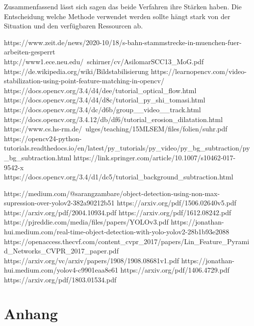 \documentclass[conference]{IEEEtran}
\begin{document}
	Zusammenfassend lässt sich sagen das beide Verfahren ihre Stärken haben. Die Entscheidung welche Methode verwendet werden sollte hängt stark von der Situation und den verfügbaren Ressourcen ab.
	
	\begin{thebibliography}{00}
		https://www.zeit.de/news/2020-10/18/s-bahn-stammstrecke-in-muenchen-fuer-arbeiten-gesperrt
		http://www1.ece.neu.edu/~schirner/cv/AsilomarSCC13\_MoG.pdf
		https://de.wikipedia.org/wiki/Bildstabilisierung
		https://learnopencv.com/video-stabilization-using-point-feature-matching-in-opencv/
		https://docs.opencv.org/3.4/d4/dee/tutorial\_optical\_flow.html
		https://docs.opencv.org/3.4/d4/d8c/tutorial\_py\_shi\_tomasi.html
		https://docs.opencv.org/3.4/dc/d6b/group\_\_video\_\_track.html
		https://docs.opencv.org/3.4.12/db/df6/tutorial\_erosion\_dilatation.html
		https://www.cs.hs-rm.de/~ulges/teaching/15MLSEM/files/folien/suhr.pdf
		https://opencv24-python-tutorials.readthedocs.io/en/latest/py\_tutorials/py\_video/py\_bg\_subtraction/py\_bg\_subtraction.html
		https://link.springer.com/article/10.1007/s10462-017-9542-x
		https://docs.opencv.org/3.4/d1/dc5/tutorial\_background\_subtraction.html
		
		https://medium.com/@sarangzambare/object-detection-using-non-max-supression-over-yolov2-382a90212b51
		https://arxiv.org/pdf/1506.02640v5.pdf
		https://arxiv.org/pdf/2004.10934.pdf %
		https://arxiv.org/pdf/1612.08242.pdf %
		https://pjreddie.com/media/files/papers/YOLOv3.pdf %
		https://jonathan-hui.medium.com/real-time-object-detection-with-yolo-yolov2-28b1b93e2088 %
		https://openaccess.thecvf.com/content\_cvpr\_2017/papers/Lin\_Feature\_Pyramid\_Networks\_CVPR\_2017\_paper.pdf %
		https://arxiv.org/vc/arxiv/papers/1908/1908.08681v1.pdf%
		https://jonathan-hui.medium.com/yolov4-c9901eaa8e61 %
		https://arxiv.org/pdf/1406.4729.pdf %
		https://arxiv.org/pdf/1803.01534.pdf %
	\end{thebibliography}
	
	\section{Anhang}
	
	
\end{document}
